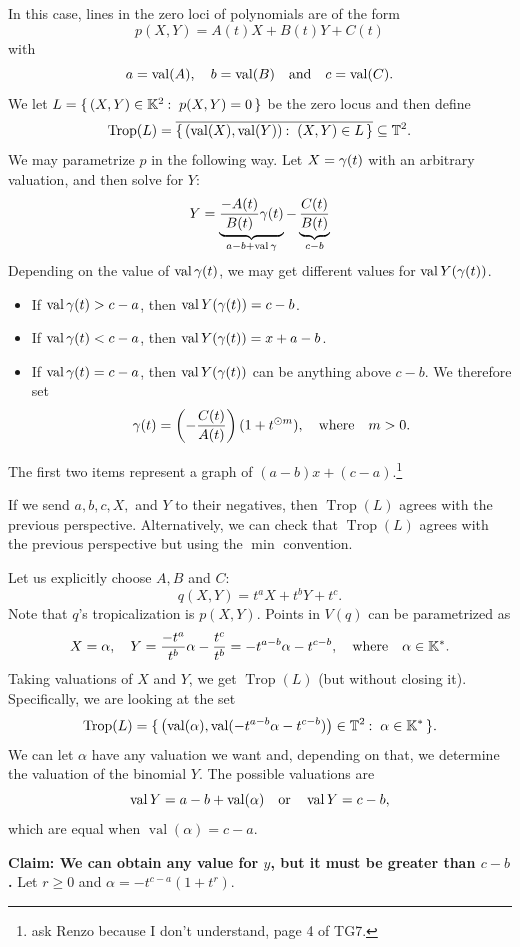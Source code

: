 \documentclass[12pt]{memoir}
\DeclareMathOperator{\val}{val}
\DeclareMathOperator{\Trop}{Trop}
\theoremstyle{definition}
\def\al{\alpha}
\begin{document}
In this case, lines in the zero loci of polynomials are of the form 
$$p(X,Y)=A(t)X+B(t)Y+C(t)$$
with 
$$a=\val(A),\quad b=\val(B)\word{and}c=\val(C).$$
We let $L=\set{(X,Y)\in\bK^2\:\ p(X,Y)=0}$ be the zero locus and then define
$$\Trop(L)=\ov{\set{(\val(X),\val(Y))\:\ (X,Y)\in L}}\subseteq\bT^2.$$
We may parametrize $p$ in the following way. Let $X=\gamma(t)$ with an arbitrary valuation, and then solve for $Y$:
$$Y=\underbrace{\frac{-A(t)}{B(t)}\ga(t)}_{a-b+\val\ga}-\underbrace{\frac{C(t)}{B(t)}}_{c-b}$$ 
 Depending on the value of $\val\ga(t)$, we may get different values for $\val Y(\ga(t))$. 
\begin{itemize}
    \itemsep=-0.4em 
    \item If $\val\ga(t)>c-a$, then $\val Y(\ga(t))=c-b$.
    \item If $\val\ga(t)<c-a$, then $\val Y(\ga(t))=x+a-b$.
    \item If $\val\ga(t)=c-a$, then $\val Y(\ga(t))$ can be anything above $c-b$. We therefore set 
    $$\gamma(t)=\left(-\frac{C(t)}{A(t)}\right)(1+t^{\odot m}),\quad\text{where}\quad m>0.$$
\end{itemize}
The first two items represent a graph of $(a-b)x+(c-a).$\footnote{ask Renzo because I don't understand, page 4 of TG7.}

\begin{Rmk}
If we send $a,b,c,X,$ and $Y$ to their negatives, then $\Trop(L)$ agrees with the previous perspective. Alternatively, we can check that $\Trop(L)$ agrees with the previous perspective but using the $\min$ convention.
\end{Rmk}

\begin{Ex}
    Let us explicitly choose $A,B$ and $C$:
    $$q(X,Y)=t^aX+t^bY+t^c.$$
    Note that $q$'s tropicalization is $p(X,Y)$.
    Points in $V(q)$ can be parametrized as 
    $$X=\al,\quad Y=\frac{-t^a}{t^b}\al-\frac{t^c}{t^b}=-t^{a-b}\al-t^{c-b},\word{where}\al\in\bK^\ast.$$
    Taking valuations of $X$ and $Y$, we get $\Trop(L)$ (but without closing it). Specifically, we are looking at the set 
    $$\Trop(L)=\set{\left(\val(\al),\val(-t^{a-b}\al-t^{c-b})\right)\in\bT^2\:\ \al\in\bK^\ast}.$$
    We can let $\al$ have any valuation we want and, depending on that, we determine the valuation of the binomial $Y$. The possible valuations are 
    $$\val Y=a-b+\val(\al)\word{or}\val Y =c-b,$$
    which are equal when $\val(\al)=c-a$. 

    \textbf{Claim: We can obtain any value for $y$, but it must be greater than $c-b$.}
    Let $r\geq 0$ and $\al=-t^{c-a}(1+t^r).$
\end{Ex}
\end{document}
